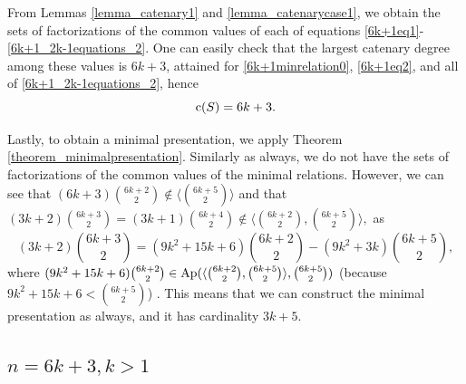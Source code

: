 \documentclass[12pt]{article}
\theoremstyle{remark}
\begin{document}
From Lemmas \ref{lemma_catenary1} and \ref{lemma_catenarycase1}, we obtain the sets of factorizations of the common values of each of equations \eqref{6k+1eq1}-\eqref{6k+1_2k-1equations_2}.
One can easily check that the largest catenary degree among these values is $6k+3$, attained for \eqref{6k+1minrelation0}, \eqref{6k+1eq2}, and all of \eqref{6k+1_2k-1equations_2}, hence
$$ \textup{c}(S) = 6k+3.$$

Lastly, to obtain a minimal presentation, we apply Theorem \ref{theorem_minimalpresentation}. Similarly as always, we do not have the sets of factorizations of the common values of the minimal relations. However, we can see that $(6k+3)\binom{6k+2}{2} \notin \langle \binom{6k+5}{2} \rangle$ and that 
$ (3k+2)\binom{6k+3}{2} = (3k+1) \binom{6k+4}{2} \notin \langle \binom{6k+2}{2}, \binom{6k+5}{2} \rangle, $
as 
$$(3k+2)\binom{6k+3}{2} = (9k^2 + 15k + 6)\binom{6k+2}{2} - (9k^2 + 3k)\binom{6k+5}{2},$$ 
where $(9k^2 + 15k + 6)\binom{6k+2}{2} \in \textup{Ap}(\langle \binom{6k+2}{2}, \binom{6k+5}{2} \rangle,\binom{6k+5}{2})$ (because $9k^2 + 15k + 6 < \binom{6k+5}{2}$) . This means that we can construct the minimal presentation as always, and it has cardinality $3k+5$.

\subsection{$n = 6k+3, k>1$}
\end{document}
